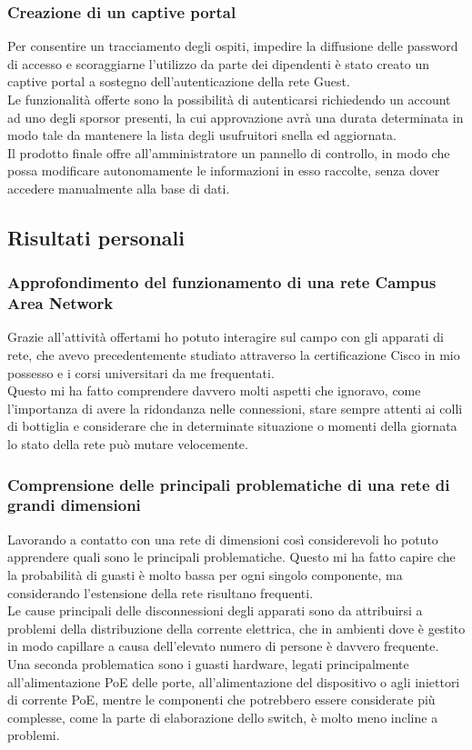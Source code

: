 \documentclass[Tesi.tex]{subfiles}
\begin{document}
\subsubsection{Creazione di un captive portal}
Per consentire un tracciamento degli ospiti, impedire la diffusione delle password di accesso e scoraggiarne l'utilizzo da parte dei dipendenti è stato creato un captive portal a sostegno dell'autenticazione della rete Guest. \\
Le funzionalità offerte sono la possibilità di autenticarsi richiedendo un account ad uno degli sporsor presenti, la cui approvazione avrà una durata determinata in modo tale da mantenere la lista degli usufruitori snella ed aggiornata. \\
Il prodotto finale offre all'amministratore un pannello di controllo, in modo che possa modificare autonomamente le informazioni in esso raccolte, senza dover accedere manualmente alla base di dati.

\newpage
\subsection{Risultati personali}
\subsubsection{Approfondimento del funzionamento di una rete Campus Area Network}
Grazie all'attività offertami ho potuto interagire sul campo con gli apparati di rete, che avevo precedentemente studiato attraverso la certificazione Cisco in mio possesso e i corsi universitari da me frequentati. \\
Questo mi ha fatto comprendere davvero molti aspetti che ignoravo, come l'importanza di avere la ridondanza nelle connessioni, stare sempre attenti ai colli di bottiglia e considerare che in determinate situazione o momenti della giornata lo stato della rete può mutare velocemente.

\subsubsection{Comprensione delle principali problematiche di una rete di grandi dimensioni}
Lavorando a contatto con una rete di dimensioni così considerevoli ho potuto apprendere quali sono le principali problematiche. Questo mi ha fatto capire che la probabilità di guasti è molto bassa per ogni singolo componente, ma considerando l'estensione della rete risultano frequenti. \\
Le cause principali delle disconnessioni degli apparati sono da attribuirsi a problemi della distribuzione della corrente elettrica, che in ambienti dove è gestito in modo capillare a causa dell'elevato numero di persone è davvero frequente. \\
Una seconda problematica sono i guasti hardware, legati principalmente all'alimentazione PoE delle porte, all'alimentazione del dispositivo o agli iniettori di corrente PoE, mentre le componenti che potrebbero essere considerate più complesse, come la parte di elaborazione dello switch, è molto meno incline a problemi.
\end{document}
